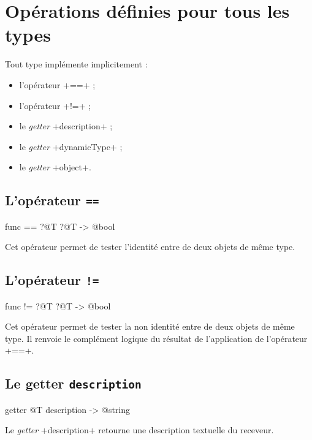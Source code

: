 \section{Opérations définies pour tous les types}

Tout type implémente implicitement :
\begin{itemize}
  \item l'opérateur \ggsq+==+ ;
  \item l'opérateur \ggsq+!=+ ;
  \item le \emph{getter} \ggsq+description+ ;
  \item le \emph{getter} \ggsq+dynamicType+ ;
  \item le \emph{getter} \ggsq+object+.
\end{itemize}


\subsection{L'opérateur \texttt{==}}

\begin{galgas4}
func == ?@T ?@T -> @bool
\end{galgas4}

Cet opérateur permet de tester l'identité entre de deux objets de même type.

\subsection{L'opérateur \texttt{!=}}

\begin{galgas4}
func != ?@T ?@T -> @bool
\end{galgas4}

Cet opérateur permet de tester la non identité entre de deux objets de même type. Il renvoie le complément logique du résultat de l'application de l'opérateur \ggsq+==+.





\subsection{Le getter \texttt{description}}

\begin{galgas4}
getter @T description -> @string
\end{galgas4}

Le \emph{getter} \ggsq+description+ retourne une description textuelle du receveur.



